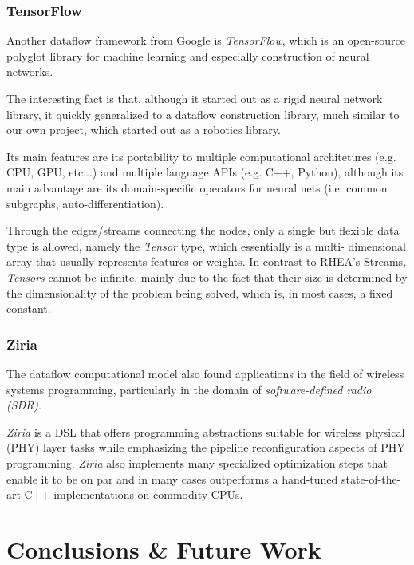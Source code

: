 \documentclass[sigplan,review,anonymous]{acmart}
\begin{document}
\subsubsection{TensorFlow}

Another dataflow framework from Google is
\textit{TensorFlow}, which is an open-source
polyglot library for machine learning and especially construction of neural
networks.

The interesting fact is that, although it started out as a rigid neural network
library, it quickly generalized to a dataflow construction library, much similar
to our own project, which started out as a robotics library.

Its main features are its portability to multiple computational architetures
(e.g. CPU, GPU, etc...) and multiple language APIs (e.g. C++, Python), although
its main advantage are its domain-specific operators for neural nets (i.e.
common subgraphs, auto-differentiation).

Through the edges/streams connecting the nodes, only a single but flexible data
type is allowed, namely the \textit{Tensor} type, which essentially is a multi-
dimensional array that usually represents features or weights. In contrast to
\textsc{RHEA}'s Streams, \textit{Tensors} cannot be infinite, mainly due to the
fact that their size is determined by the dimensionality of the problem being
solved, which is, in most cases, a fixed constant.

\subsubsection{Ziria}

The dataflow computational model also found applications in the field of
wireless systems programming, particularly in the domain of
\textit{software-defined radio (SDR)}.

\textit{Ziria}\cite{ziria} is a DSL that offers programming abstractions suitable
for wireless physical (PHY) layer tasks while emphasizing the pipeline
reconfiguration aspects of PHY programming. \textit{Ziria} also implements many
specialized optimization steps that enable it to be on par and in many cases
outperforms a hand-tuned state-of-the-art C++ implementations on commodity
CPUs.

\section{Conclusions \& Future Work} \label{sec:conclusions}
\end{document}
